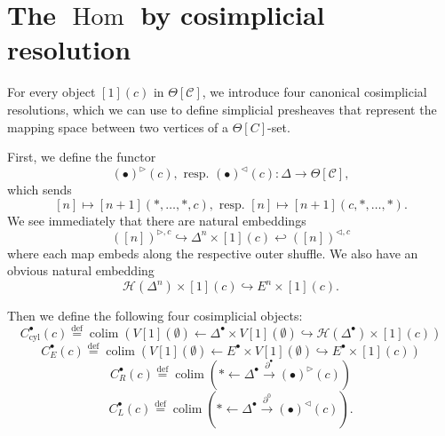 \documentclass{amsart}
\numberwithin{equation}{section}
\theoremstyle{plain}   %
\theoremstyle{remark}
\theoremstyle{plain}
\DeclareMathOperator{\colim}{colim}
\DeclareMathOperator{\Hom}{Hom}
\newcommand{\C}{\ensuremath{\mathcal{C}}}
\newcommand{\defeq}{\overset{\mathrm{def}}=}
\begin{document}
\section{The \(\Hom\) by cosimplicial resolution}
For every object \([1](c)\) in \(\Theta[\C]\), we introduce four canonical cosimplicial resolutions, which we can use to define simplicial presheaves that represent the mapping space between two vertices of a \(\Theta[C]\)-set.

First, we define the functor
\[(\bullet)^{\triangleright}(c),\text{ resp. }(\bullet)^{\triangleleft}(c): \Delta \to \Theta[\C],\]
which sends
\[[n]\mapsto [n+1](\ast,\dots,\ast,c), \text{ resp. } [n]\mapsto [n+1](c,\ast,\dots,\ast).\]
We see immediately that there are natural embeddings
\[([n])^{\triangleright,c} \hookrightarrow \Delta^n \times [1](c)  \hookleftarrow ([n])^{\triangleleft,c}\]
where each map embeds along the respective outer shuffle. We also have an obvious natural embedding
\[\mathscr{H}(\Delta^n)\times [1](c) \hookrightarrow E^n\times [1](c).\]

Then we define the following four cosimplicial objects:
\[C^\bullet_{\mathrm{cyl}}(c)\defeq \colim \left( V[1](\emptyset) \leftarrow \Delta^\bullet \times V[1](\emptyset) \hookrightarrow \mathscr{H}(\Delta^\bullet)\times [1](c)\right)\]
\[C^\bullet_{E}(c)\defeq \colim \left( V[1](\emptyset) \leftarrow E^\bullet \times V[1](\emptyset) \hookrightarrow E^\bullet\times [1](c)\right)\]
\[C^\bullet_{R}(c)\defeq \colim \left( \ast \leftarrow \Delta^\bullet \xrightarrow{\partial^{\bullet}} (\bullet)^\triangleright(c)\right)\]
\[C^\bullet_{L}(c)\defeq \colim \left( \ast \leftarrow \Delta^\bullet \xrightarrow{\partial^0} (\bullet)^\triangleleft(c)\right).\]
\end{document}
